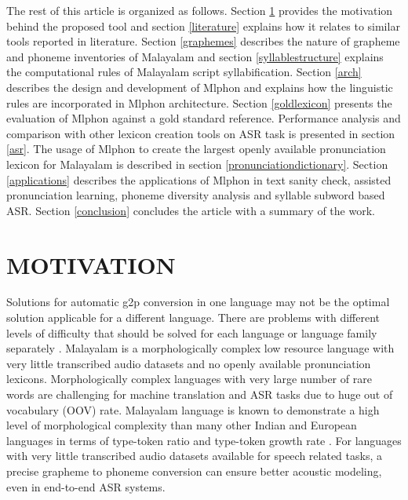 \documentclass{ieeeaccess}
\begin{document}
The rest of this article is organized as follows. Section \ref{motivation} provides the motivation behind the proposed tool and section \ref{literature} explains how it relates to similar tools reported in literature. Section \ref{graphemes} describes the nature of grapheme and phoneme inventories of Malayalam and section \ref{syllablestructure} explains the computational rules of Malayalam script syllabification. Section \ref{arch} describes the design and development of Mlphon and explains how the linguistic rules are incorporated in Mlphon architecture.  Section \ref{goldlexicon} presents the evaluation of Mlphon against a gold standard reference. Performance analysis and comparison with other lexicon creation tools on ASR task is presented in section \ref{asr}. The usage of Mlphon to create the largest openly available pronunciation lexicon for Malayalam is described in section \ref{pronunciationdictionary}.
Section \ref{applications} describes the applications of Mlphon in text sanity check, assisted pronunciation learning, phoneme diversity analysis and syllable subword based ASR. Section \ref{conclusion} concludes the article with a summary of the work.

\section{MOTIVATION}
\label{motivation}

Solutions for automatic g2p conversion in one language may not be the optimal solution applicable for a different language. There are problems with different levels of difficulty that should be solved for each language or language family separately \cite{mdpi2022ruleg2p}. Malayalam is a morphologically complex low resource language with very little transcribed audio datasets and no openly available pronunciation lexicons. Morphologically complex languages with very large number of rare words are challenging for machine translation and ASR tasks due to huge out of vocabulary (OOV) rate. Malayalam language is known to demonstrate a high level of morphological complexity than many other Indian and European languages in terms of type-token ratio and type-token growth rate \cite{manohar2020quantitative, bharadwaja2007statistical}. 
For languages with very little transcribed audio datasets available for speech related tasks, a precise grapheme to phoneme conversion can ensure better acoustic modeling, even in end-to-end \cite{baevski2021unsupervised} ASR systems. 
\end{document}
